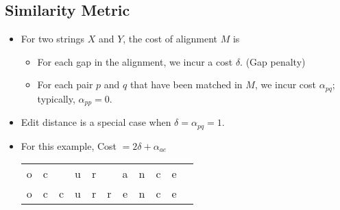 \documentclass[12pt]{article}
\begin{document}
\subsection{Similarity Metric}
\begin{itemize}
    \item For two strings $X$ and $Y$, the cost of alignment $M$ is
    \begin{itemize}
        \item For each gap in the alignment, we incur a cost $\delta$. (Gap penalty)
        \item For each pair $p$ and $q$ that have been matched in $M$, we incur cost $\alpha_{pq}$; typically, $\alpha_{pp} = 0$.
    \end{itemize}
    \item Edit distance is a special case when $\delta = \alpha_{pq} = 1$.
    \item For this example, Cost $= 2\delta + \alpha_{ae}$
        \begin{center}
            \begin{tabular}{c c c c c c c c c c c}
                o & c &  & u & r &  & a & n & c & e \\
                o & c & c & u & r & r & e & n & c & e \\
            \end{tabular}
        \end{center}
\end{itemize}
\end{document}
